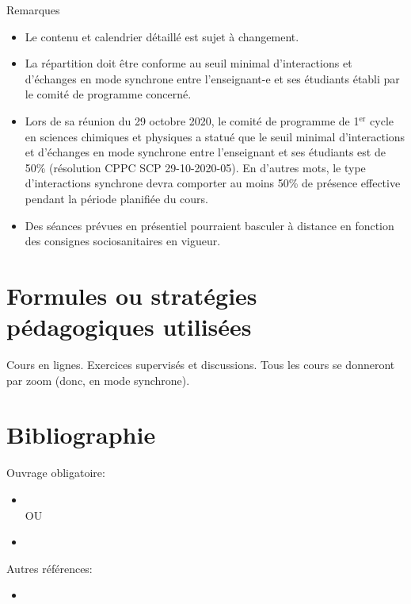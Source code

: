 \documentclass[12pt,undergraduate]{uqtrplandecours}
\begin{document}
\bigskip
\noindent
Remarques
\begin{itemize}
  \item Le contenu et calendrier détaillé est sujet à changement.
  \item La répartition doit être conforme au seuil minimal d’interactions et d’échanges en mode synchrone
        entre l’enseignant-e et ses étudiants établi par le comité de programme concerné.
  \item Lors de sa réunion du 29 octobre 2020, le comité de programme de 1$^{\text{er}}$ cycle en sciences chimiques et physiques
        a statué que le seuil minimal d’interactions et d’échanges en mode synchrone
        entre l’enseignant et ses étudiants est de 50\% (résolution CPPC SCP 29-10-2020-05).
        En d’autres mots, le type d’interactions synchrone devra comporter au moins 50\%
        de présence effective pendant la période planifiée du cours.
  \item Des séances prévues en présentiel pourraient basculer à distance en fonction des consignes sociosanitaires en vigueur.
\end{itemize}

\FloatBarrier


\clearpage
\section{Formules ou stratégies pédagogiques utilisées}

Cours en lignes. Exercices supervisés et discussions.
Tous les cours se donneront par zoom (donc, en mode synchrone).

\section{Bibliographie}

Ouvrage obligatoire:
\begin{itemize}
  \item {}
\\ OU
  \item {}
\end{itemize}

Autres références:
\begin{itemize}
  \item {}
\end{itemize}
\end{document}
